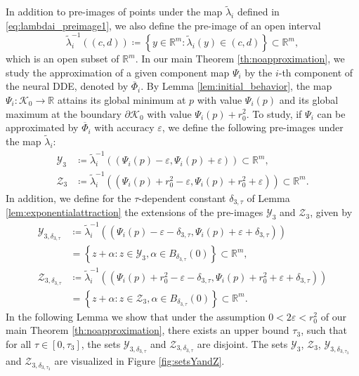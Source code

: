 \documentclass[10pt]{article}
\numberwithin{equation}{section}
\newcommand{\eps}{\varepsilon}
\begin{document}
	
	In addition to pre-images of points under the map $\tilde \lambda_i$ defined in \eqref{eq:lambdai_preimage1}, we also define the pre-image of an open interval
	\begin{equation} \label{eq:lambdai_preimage2}
		\tilde{\lambda}_i^{-1}\left((c,d)\right) \coloneqq \left\{y \in \mathbb{R}^m: \tilde\lambda_i(y) \in (c,d)  \right\} \subset \mathbb{R}^m,
	\end{equation}
	which is an open subset of $\mathbb{R}^m$.
	In our main Theorem \ref{th:noapproximation}, we study the approximation of a given component map $\Psi_i$ by the $i$-th component of the neural DDE, denoted by $\overline{\Phi}_i$. By Lemma \ref{lem:initial_behavior}, the map $\Psi_i:\mathcal{K}_0\rightarrow \mathbb{R}$ attains its global minimum at $p$ with value $\Psi_i(p)$ and its global maximum at the boundary $\partial \mathcal{K}_0$ with value $\Psi_i(p)+r_0^2$. To study, if $\Psi_i$ can be approximated by $\overline{\Phi}_i$ with accuracy $\eps$, we define the following pre-images under the map $\tilde \lambda_i$:
	\begin{align}
		\label{eq:Y3}\mathcal{Y}_3 &\coloneqq \tilde{\lambda}^{-1}_i\left((\Psi_i(p)-\eps,\Psi_i(p)+\eps)\right) \subset \mathbb{R}^m, \\
		\label{eq:Z3}\mathcal{Z}_3 & \coloneqq \tilde{\lambda}^{-1}_i\left((\Psi_i(p)+r_0^2-\eps,\Psi_i(p)+r_0^2+\eps)\right) \subset \mathbb{R}^m.
	\end{align}
	In addition, we define for the $\tau$-dependent constant $\delta_{3,\tau}$ of Lemma \ref{lem:exponentialattraction} the extensions of the pre-images $\mathcal{Y}_3 $ and $\mathcal{Z}_3$, given by 
	\begin{align}
		\label{eq:Y3delta}\mathcal{Y}_{3,\delta_{3,\tau}} &\coloneqq \tilde{\lambda}_i^{-1}\left((\Psi_i(p)-\eps-\delta_{3,\tau},\Psi_i(p)+\eps+\delta_{3,\tau})\right) \\
		&= \left\{z+ \alpha:z \in \mathcal{Y}_3, \alpha \in B_{\delta_{3,\tau}}(0) \right\} \subset \mathbb{R}^m, \nonumber\\
		\label{eq:Z3delta}\mathcal{Z}_{3,\delta_{3,\tau}} &\coloneqq \tilde{\lambda}^{-1}_i\left((\Psi_i(p)+r_0^2-\eps-\delta_{3,\tau},\Psi_i(p)+r_0^2+\eps+\delta_{3,\tau})\right) \\
		&= \left\{z+ \alpha:z \in \mathcal{Z}_3, \alpha \in B_{\delta_{3,\tau}}(0) \right\}\subset \mathbb{R}^m. \nonumber
	\end{align}
	In the following Lemma we show that under the assumption $0<2\eps<r_0^2$ of our main Theorem \ref{th:noapproximation}, there exists an upper bound $\tau_3$, such that for all $\tau\in[0,\tau_3]$, the sets $\mathcal{Y}_{3,\delta_{3,\tau}} $ and $\mathcal{Z}_{3,\delta_{3,\tau}}$ are disjoint. The sets $\mathcal{Y}_3$, $\mathcal{Z}_3$, $\mathcal{Y}_{3,\delta_{3,\tau_3}}$ and $\mathcal{Z}_{3,\delta_{3,\tau_3}}$ are visualized in Figure \ref{fig:setsYandZ}.
	
\end{document}
